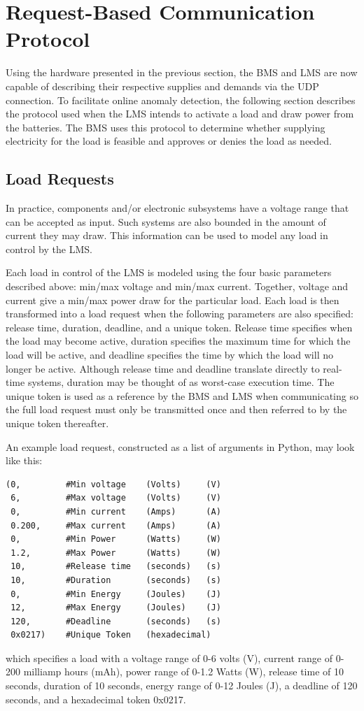 \documentclass[11pt,conference,draftcls,onecolumn]{IEEEtran}
\begin{document}
\section{Request-Based Communication Protocol}\label{sec:rbComm}
Using the hardware presented in the previous section, the BMS and LMS are now capable of describing their respective supplies and demands via the UDP connection.
To facilitate online anomaly detection, the following section describes the protocol used when the LMS intends to activate a load and draw power from the batteries.
The BMS uses this protocol to determine whether supplying electricity for the load is feasible and approves or denies the load as needed.

\subsection{Load Requests}
In practice, components and/or electronic subsystems have a voltage range that can be accepted as input.
Such systems are also bounded in the amount of current they may draw.
This information can be used to model any load in control by the LMS.

Each load in control of the LMS is modeled using the four basic parameters described above: min/max voltage and min/max current.
Together, voltage and current give a min/max power draw for the particular load.
Each load is then transformed into a load request when the following parameters are also specified: release time, duration, deadline, and a unique token.
Release time specifies when the load may become active, duration specifies the maximum time for which the load will be active, and deadline specifies the time by which the load will no longer be active.
Although release time and deadline translate directly to real-time systems, duration may be thought of as worst-case execution time.
The unique token is used as a reference by the BMS and LMS when communicating so the full load request must only be transmitted once and then referred to by the unique token thereafter.

An example load request, constructed as a list of arguments in Python, may look like this:
\begin{lstlisting}
(0,         #Min voltage    (Volts)     (V)
 6,         #Max voltage    (Volts)     (V)
 0,         #Min current    (Amps)      (A)
 0.200,     #Max current    (Amps)      (A)
 0,         #Min Power      (Watts)     (W)
 1.2,       #Max Power      (Watts)     (W)
 10,        #Release time   (seconds)   (s)
 10,        #Duration       (seconds)   (s)
 0,         #Min Energy     (Joules)    (J)
 12,        #Max Energy     (Joules)    (J)
 120,       #Deadline       (seconds)   (s)
 0x0217)    #Unique Token   (hexadecimal)
\end{lstlisting}
which specifies a load with a voltage range of 0-6 volts (V), current range of 0-200 milliamp hours (mAh), power range of 0-1.2 Watts (W), release time of 10 seconds, duration of 10 seconds, energy range of 0-12 Joules (J), a deadline of 120 seconds, and a hexadecimal token 0x0217.
\end{document}
